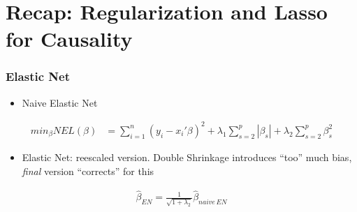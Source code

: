 \documentclass[
  shownotes,
  xcolor={svgnames},
  hyperref={colorlinks,citecolor=DarkBlue,linkcolor=DarkRed,urlcolor=DarkBlue}
  , aspectratio=169]{beamer}
\begin{document}
\section{Recap: Regularization and Lasso for Causality }
\begin{frame}[fragile]
\frametitle{Elastic Net}

\begin{itemize}
\item Naive Elastic Net
\end{itemize}

\begin{align}
min_{\beta} NEL(\beta) &= \sum_{i=1}^n (y_i-x_i'\beta)^2 + \lambda_1 \sum_{s=2}^p |\beta_s| + \lambda_2 \sum_{s=2}^p \beta_s^2 
\end{align}

\begin{itemize}
\item Elastic Net: reescaled version. Double Shrinkage introduces ``too'' much bias, {\it final} version ``corrects'' for this
\end{itemize}
\bigskip
\begin{align}
\hat{\beta}_{EN}= \frac{1}{\sqrt{1+\lambda_2}}\hat{\beta}_{naive\,EN}
\end{align}




\end{frame}
\end{document}
